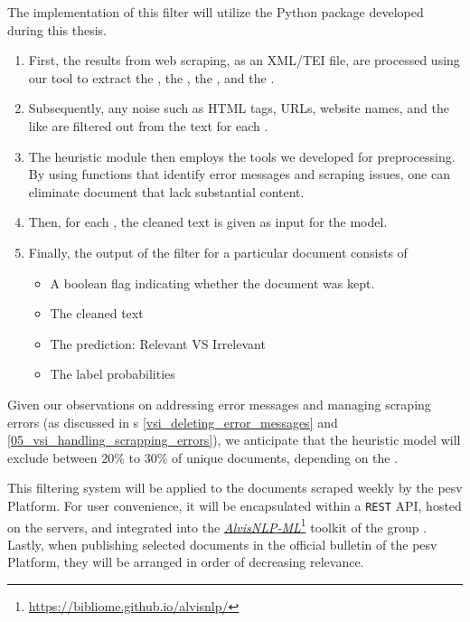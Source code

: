 The implementation of this filter will utilize the Python package developed during this thesis.


\begin{enumerate}

    \item First, the results from web scraping, as an XML/TEI file, are processed using our tool to extract the \trafilaturaTitle{}, the \trafilaturaAbstract{}, the \trafilaturaFulltext{}, and the \translationTitle{}.
    
    \item Subsequently, any noise such as HTML tags, URLs, website names, and the like are filtered out from the text for each \contentType{}.

    \item The heuristic module then employs the tools we developed for preprocessing. By using functions that identify error messages and scraping issues, one can eliminate document that lack substantial content.

    \item  Then, for each \contentType{}, the cleaned text is given as input for the \textclassification{} model.

    \item Finally, the output of the filter for a particular document consists of
    \begin{itemize}
        \item A boolean flag indicating whether the document was kept.
        \item The cleaned text
        \item The prediction: Relevant VS Irrelevant
        \item The label probabilities
    \end{itemize}


\end{enumerate}

Given our observations on addressing error messages and managing scraping errors (as discussed in \headerName{}s \ref{vsi_deleting_error_messages} and \ref{05_vsi_handling_scrapping_errors}), we anticipate that the heuristic model will exclude between 20\% to 30\% of unique documents, depending on the \contentType{}.

This filtering system will be applied to the documents scraped weekly by the \gls{pesv} Platform. 
For user convenience, it will be encapsulated within a \texttt{REST} API, hosted on the \MAIAGE{} servers, and integrated into the \href{https://bibliome.github.io/alvisnlp/)}{\emph{AlvisNLP-ML}}\footnote{\url{https://bibliome.github.io/alvisnlp/}} toolkit of the \bibliome{} group . 
Lastly, when publishing selected documents in the official bulletin of the \gls{pesv} Platform, they will be arranged in order of decreasing relevance.



